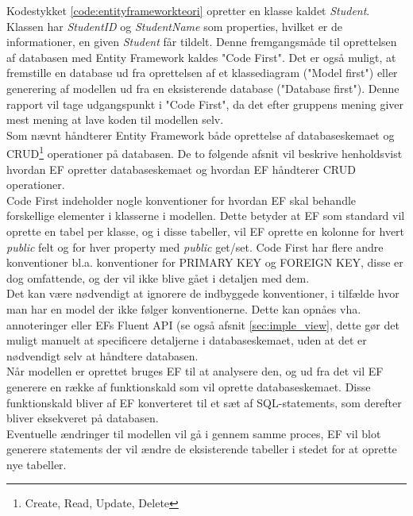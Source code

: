 
Kodestykket \ref{code:entityframeworkteori} opretter en klasse kaldet \textit{Student}. Klassen har \textit{StudentID} og \textit{StudentName} som properties, hvilket er de informationer, en given \textit{Student} får tildelt. Denne fremgangsmåde til oprettelsen af databasen med Entity Framework kaldes "Code First". Det er også muligt, at fremstille en database ud fra oprettelsen af et klassediagram ("Model first") eller generering af modellen ud fra en eksisterende database ("Database first"). Denne rapport vil tage udgangspunkt i "Code First", da det efter gruppens mening giver mest mening at lave koden til modellen selv.\\

Som nævnt håndterer Entity Framework både oprettelse af databaseskemaet og CRUD\footnote{Create, Read, Update, Delete} operationer på databasen. De to følgende afsnit vil beskrive henholdsvist hvordan EF opretter databaseskemaet og hvordan EF håndterer CRUD operationer.\\

\label{subsubsubsec:efdbskema}
Code First indeholder nogle konventioner for hvordan EF skal behandle forskellige elementer i klasserne i modellen. Dette betyder at EF som standard vil oprette en tabel per klasse, og i disse tabeller, vil EF oprette en kolonne for hvert \textit{public} felt og for hver property med \textit{public} get/set. Code First har flere andre konventioner bl.a. konventioner for PRIMARY KEY og FOREIGN KEY, disse er dog omfattende, og der vil ikke blive gået i detaljen med dem.\\
Det kan være nødvendigt at ignorere de indbyggede konventioner, i tilfælde hvor man har en model der ikke følger konventionerne. Dette kan opnåes vha. annoteringer\cite{annotations} eller EFs Fluent API\cite{fluentapi} (se også afsnit \ref{sec:imple_view}, dette gør det muligt manuelt at specificere detaljerne i databaseskemaet, uden at det er nødvendigt selv at håndtere databasen.\\

Når modellen er oprettet bruges EF til at analysere den, og ud fra det vil EF generere en række af funktionskald som vil oprette databaseskemaet. Disse funktionskald bliver af EF konverteret til et sæt af SQL-statements, som derefter bliver eksekveret på databasen.\\
Eventuelle ændringer til modellen vil gå i gennem samme proces, EF vil blot generere statements der vil ændre de eksisterende tabeller i stedet for at oprette nye tabeller.

